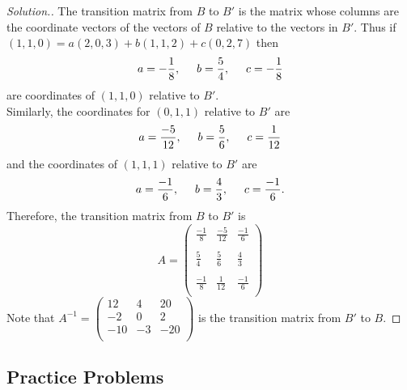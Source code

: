 \documentclass[11pt,a4paper]{article}
\theoremstyle{definition}
\newenvironment{solution}
  {\renewcommand{\qedsymbol}{}\begin{proof}[\textit{Solution}.]}
  {\end{proof}}
\begin{document}
\begin{solution}
The transition matrix from $B$ to $B'$ is the matrix whose columns are the coordinate vectors of the vectors of $B$ relative to the vectors in $B'$. Thus if $(1,1,0)=a(2,0,3)+b(1,1,2)+c(0,2,7)$ then $$a=-\frac{1}{8},\hspace{0.5cm}b=\frac{5}{4},\hspace{0.5cm} c=-\frac{1}{8}$$ are coordinates of $(1,1,0)$ relative to $B'$.\\ Similarly, the coordinates for $(0,1,1)$ relative to $B'$ are $$a=\frac{-5}{12},\hspace{0.5cm} b=\frac{5}{6},\hspace{0,5cm}c=\frac{1}{12}$$ and the coordinates of $(1,1,1)$ relative to $B'$ are $$a=\frac{-1}{6},\hspace{0.5cm} b=\frac{4}{3},\hspace{0.5cm} c=\frac{-1}{6}.$$ Therefore, the transition matrix from $B$ to $B'$ is $$
A=
\begin{pmatrix}
\frac{-1}{8}&\frac{-5}{12}&\frac{-1}{6}\\\\ \frac{5}{4}&\frac{5}{6}&\frac{4}{3}\\\\ \frac{-1}{8}&\frac{1}{12}&\frac{-1}{6}\\
\end{pmatrix}
$$
Note that $A^{-1}=
\begin{pmatrix}
12&4&20\\ -2&0&2\\ -10&-3&-20\\
\end{pmatrix}
$ is the transition matrix from $B'$ to $B$.


\end{solution}

\subsection{Practice Problems}
\end{document}
